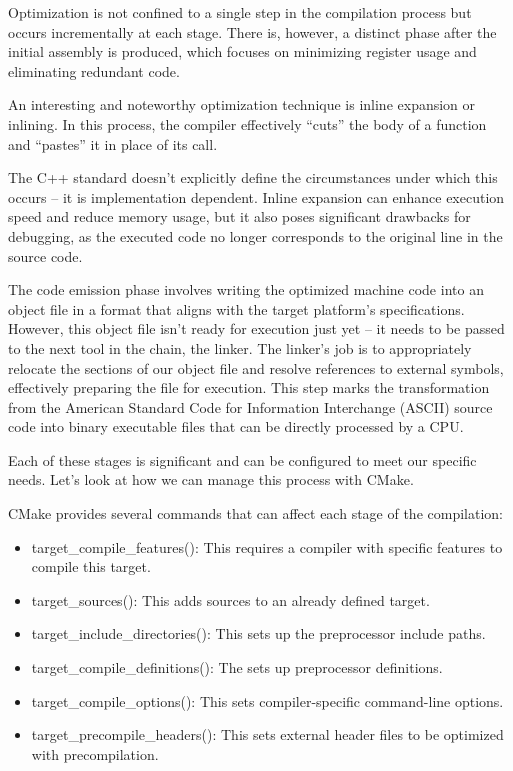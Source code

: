 Optimization is not confined to a single step in the compilation process but occurs incrementally at each stage. There is, however, a distinct phase after the initial assembly is produced, which focuses on minimizing register usage and eliminating redundant code.

An interesting and noteworthy optimization technique is inline expansion or inlining. In this process, the compiler effectively “cuts” the body of a function and “pastes” it in place of its call.

The C++ standard doesn’t explicitly define the circumstances under which this occurs – it is implementation dependent. Inline expansion can enhance execution speed and reduce memory usage, but it also poses significant drawbacks for debugging, as the executed code no longer corresponds to the original line in the source code.

The code emission phase involves writing the optimized machine code into an object file in a format that aligns with the target platform’s specifications. However, this object file isn’t ready for execution just yet – it needs to be passed to the next tool in the chain, the linker. The linker’s job is to appropriately relocate the sections of our object file and resolve references to external symbols, effectively preparing the file for execution. This step marks the transformation from the American Standard Code for Information Interchange (ASCII) source code into binary executable files that can be directly processed by a CPU.

Each of these stages is significant and can be configured to meet our specific needs. Let’s look at how we can manage this process with CMake.


CMake provides several commands that can affect each stage of the compilation:

\begin{itemize}
\item
target\_compile\_features(): This requires a compiler with specific features to compile this target.

\item
target\_sources(): This adds sources to an already defined target.

\item
target\_include\_directories(): This sets up the preprocessor include paths.

\item
target\_compile\_definitions(): The sets up preprocessor definitions.

\item
target\_compile\_options(): This sets compiler-specific command-line options.

\item
target\_precompile\_headers(): This sets external header files to be optimized with precompilation.
\end{itemize}

